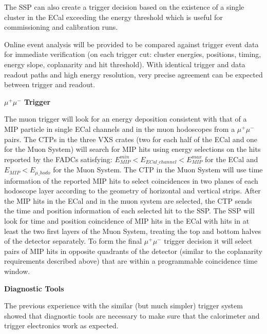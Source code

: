 The SSP can also create a trigger decision based on the existence of a single cluster in the ECal exceeding the energy threshold which is  useful for commissioning and calibration runs. 

Online event analysis will be provided to be compared against trigger event data for immediate verification (on each trigger cut: cluster energies, positions, timing, energy slope, coplanarity and hit threshold). With identical trigger and data readout paths and high energy resolution, very precise agreement can be expected between trigger and readout.




\vspace{1cm}
{\bf $\mu^+\mu^-$ Trigger} 

The muon trigger will look for an energy deposition consistent with that of a MIP particle in single ECal channels and in the muon hodoscopes from a $\mu^+\mu^-$ pairs.  The CTPs in the three VXS crates (two for each half of the ECal and one for the Muon System) will search for MIP hits using energy selections on the hits reported by the FADCs satisfying: $E_{MIP}^{min}<E_{ECal\_channel}<E_{MIP}^{max}$ for the ECal and $E_{MIP}<E_{\mu\_hodo}$ for the Muon System. The CTP in the Muon System will use time information of the reported MIP hits to select coincidences in two planes of each hodoscope layer according to the geometry of horizontal and vertical strips. After the MIP hits in the ECal and in the muon system are selected, the CTP sends the time and position information of each selected hit to the SSP. The SSP will look for time and position coincidence of MIP hits in the ECal with hits in at least the two first layers of the Muon System, treating the top and bottom halves of the detector separately. To form the final $\mu^+\mu^-$ trigger decision it will select pairs of MIP hits in opposite quadrants of the detector (similar to the coplanarity requirements described above) that are within a programmable coincidence time window. 



\vspace{1cm}
{\bf Diagnostic Tools}

The previous experience with the similar (but much simpler) trigger system showed that diagnostic tools are necessary to make sure that the calorimeter and trigger electronics work as expected. 

